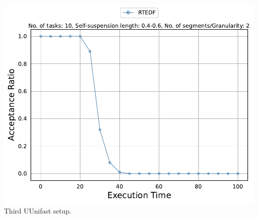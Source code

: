\documentclass[]{article}
\begin{document}
\begin{minipage}[t]{0.48\linewidth}
		\includegraphics[width=\linewidth]{RTEDF[2][0.4-0.6][10].pdf}
		Third UUnifast setup.
		\vspace{0.3cm}
		
		
	\end{minipage}\hfill
\end{document}
